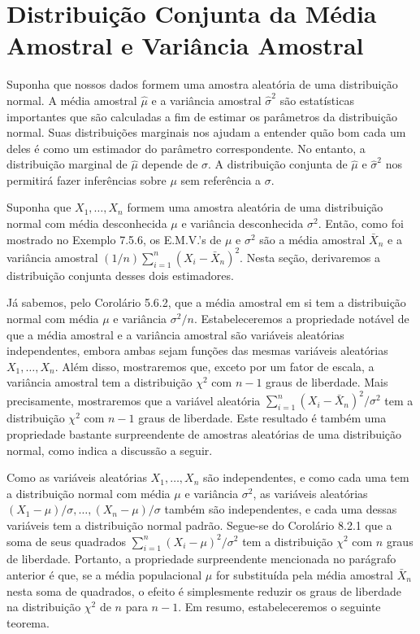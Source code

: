 \section{Distribuição Conjunta da Média Amostral e Variância Amostral}

Suponha que nossos dados formem uma amostra aleatória de uma distribuição normal. A média amostral $\hat{\mu}$ e a variância amostral $\hat{\sigma}^2$ são estatísticas importantes que são calculadas a fim de estimar os parâmetros da distribuição normal. Suas distribuições marginais nos ajudam a entender quão bom cada um deles é como um estimador do parâmetro correspondente. No entanto, a distribuição marginal de $\hat{\mu}$ depende de $\sigma$. A distribuição conjunta de $\hat{\mu}$ e $\hat{\sigma}^2$ nos permitirá fazer inferências sobre $\mu$ sem referência a $\sigma$.

Suponha que $X_1, \dots, X_n$ formem uma amostra aleatória de uma distribuição normal com média desconhecida $\mu$ e variância desconhecida $\sigma^2$. Então, como foi mostrado no Exemplo 7.5.6, os E.M.V.'s de $\mu$ e $\sigma^2$ são a média amostral $\bar{X}_n$ e a variância amostral $(1/n)\sum_{i=1}^n (X_i - \bar{X}_n)^2$. Nesta seção, derivaremos a distribuição conjunta desses dois estimadores.

Já sabemos, pelo Corolário 5.6.2, que a média amostral em si tem a distribuição normal com média $\mu$ e variância $\sigma^2/n$. Estabeleceremos a propriedade notável de que a média amostral e a variância amostral são variáveis aleatórias independentes, embora ambas sejam funções das mesmas variáveis aleatórias $X_1, \dots, X_n$. Além disso, mostraremos que, exceto por um fator de escala, a variância amostral tem a distribuição $\chi^2$ com $n-1$ graus de liberdade. Mais precisamente, mostraremos que a variável aleatória $\sum_{i=1}^n(X_i - \bar{X}_n)^2/\sigma^2$ tem a distribuição $\chi^2$ com $n-1$ graus de liberdade. Este resultado é também uma propriedade bastante surpreendente de amostras aleatórias de uma distribuição normal, como indica a discussão a seguir.

Como as variáveis aleatórias $X_1, \dots, X_n$ são independentes, e como cada uma tem a distribuição normal com média $\mu$ e variância $\sigma^2$, as variáveis aleatórias $(X_1-\mu)/\sigma, \dots, (X_n-\mu)/\sigma$ também são independentes, e cada uma dessas variáveis tem a distribuição normal padrão. Segue-se do Corolário 8.2.1 que a soma de seus quadrados $\sum_{i=1}^n(X_i-\mu)^2/\sigma^2$ tem a distribuição $\chi^2$ com $n$ graus de liberdade. Portanto, a propriedade surpreendente mencionada no parágrafo anterior é que, se a média populacional $\mu$ for substituída pela média amostral $\bar{X}_n$ nesta soma de quadrados, o efeito é simplesmente reduzir os graus de liberdade na distribuição $\chi^2$ de $n$ para $n-1$. Em resumo, estabeleceremos o seguinte teorema.

